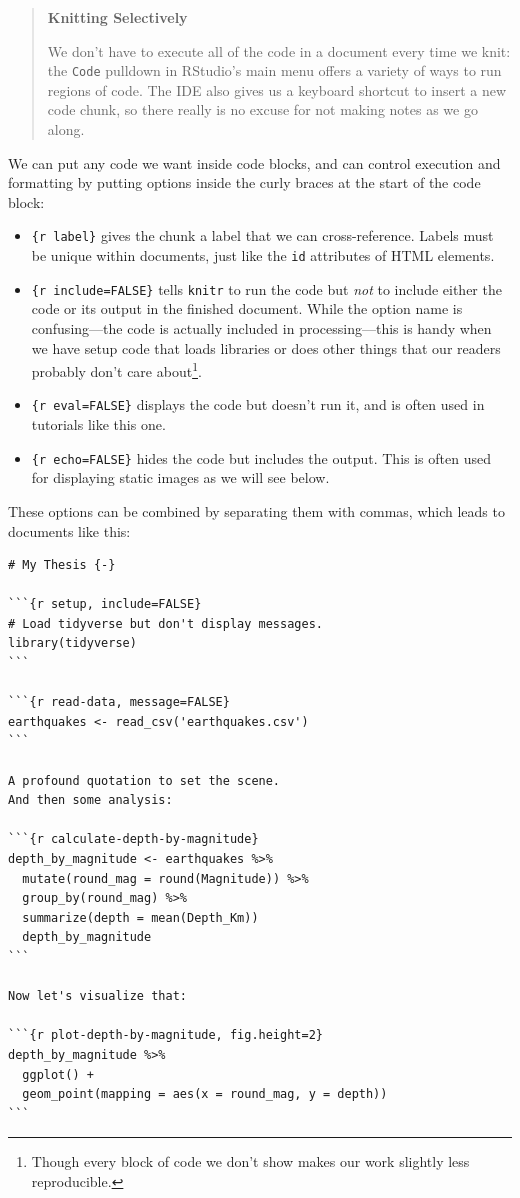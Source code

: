 \begin{quote}
\textbf{Knitting Selectively}

We don't have to execute all of the code in a document every time we knit:
the \texttt{Code} pulldown in RStudio's main menu offers a variety of ways
to run regions of code.
The IDE also gives us a keyboard shortcut to insert a new code chunk,
so there really is no excuse for not making notes as we go along.
\end{quote}

We can put any code we want inside code blocks,
and can control execution and formatting
by putting options inside the curly braces at the start of the code block:

\begin{itemize}
\item
  \texttt{\{r\ label\}} gives the chunk a label that we can cross-reference.
  Labels must be unique within documents,
  just like the \texttt{id} attributes of HTML elements.
\item
  \texttt{\{r\ include=FALSE\}} tells \texttt{knitr} to run the code
  but \emph{not} to include either the code or its output in the finished document.
  While the option name is confusing---the code is actually included in processing---this
  is handy when we have setup code that loads libraries or does other things
  that our readers probably don't care about\footnote{Though every block of code we don't show
    makes our work slightly less reproducible.}.
\item
  \texttt{\{r\ eval=FALSE\}} displays the code but doesn't run it,
  and is often used in tutorials like this one.
\item
  \texttt{\{r\ echo=FALSE\}} hides the code but includes the output.
  This is often used for displaying static images
  as we will see below.
\end{itemize}

These options can be combined by separating them with commas,
which leads to documents like this:

\begin{lstlisting}
# My Thesis {-}

```{r setup, include=FALSE}
# Load tidyverse but don't display messages.
library(tidyverse)
```

```{r read-data, message=FALSE}
earthquakes <- read_csv('earthquakes.csv')
```

A profound quotation to set the scene.
And then some analysis:

```{r calculate-depth-by-magnitude}
depth_by_magnitude <- earthquakes %>%
  mutate(round_mag = round(Magnitude)) %>%
  group_by(round_mag) %>%
  summarize(depth = mean(Depth_Km))
  depth_by_magnitude
```

Now let's visualize that:

```{r plot-depth-by-magnitude, fig.height=2}
depth_by_magnitude %>%
  ggplot() +
  geom_point(mapping = aes(x = round_mag, y = depth))
```
\end{lstlisting}

